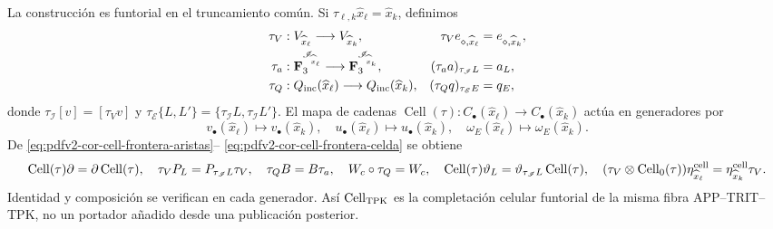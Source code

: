 La construcción es funtorial en el truncamiento común. Si
\(\tau_{\ell,k}\widehat x_\ell=\widehat x_k\), definimos
\begin{align*}
 \tau_V&:V_{\widehat x_\ell}\longrightarrow V_{\widehat x_k},&
 \tau_Ve_{\diamond,\widehat x_\ell}&=e_{\diamond,\widehat x_k},\\
 \tau_a&:\mathbf F_3^{\mathscr I_{\widehat x_\ell}}
          \longrightarrow\mathbf F_3^{\mathscr I_{\widehat x_k}},&
 (\tau_aa)_{\tau_{\mathscr I}L}&=a_L,\\
 \tau_Q&:Q_{\rm inc}(\widehat x_\ell)
          \longrightarrow Q_{\rm inc}(\widehat x_k),&
 (\tau_Qq)_{\tau_{\mathscr E}E}&=q_E,
\end{align*}
donde \(\tau_{\mathscr I}[v]=[\tau_Vv]\) y
\(\tau_{\mathscr E}\{L,L'\}=\{\tau_{\mathscr I}L,
\tau_{\mathscr I}L'\}\). El mapa de cadenas
\(\operatorname{Cell}(\tau):C_\bullet(\widehat x_\ell)
\to C_\bullet(\widehat x_k)\) actúa en generadores por
\begin{equation}
\label{eq:pdfv2-cor-cell-truncamiento-generadores}
 v_\bullet(\widehat x_\ell)\mapsto v_\bullet(\widehat x_k),\quad
 u_\bullet(\widehat x_\ell)\mapsto u_\bullet(\widehat x_k),\quad
 \omega_E(\widehat x_\ell)\mapsto\omega_E(\widehat x_k).
\end{equation}
De \eqref{eq:pdfv2-cor-cell-frontera-aristas}--
\eqref{eq:pdfv2-cor-cell-frontera-celda} se obtiene
\begin{equation}
\label{eq:pdfv2-cor-collar-naturalidad}
 \operatorname{Cell}(\tau)\partial
 =\partial\operatorname{Cell}(\tau),\quad
 \tau_VP_L=P_{\tau_{\mathscr I}L}\tau_V,\quad
 \tau_QB=B\tau_a,\quad
 W_c\circ\tau_Q=W_c,\quad
 \operatorname{Cell}(\tau)\vartheta_L
 =\vartheta_{\tau_{\mathscr I}L}\operatorname{Cell}(\tau),\quad
 (\tau_V\otimes\operatorname{Cell}_0(\tau))
 \eta^{\rm cell}_{\widehat x_\ell}
 =\eta^{\rm cell}_{\widehat x_k}\tau_V.
\end{equation}
Identidad y composición se verifican en cada generador. Así
\(\operatorname{Cell}_{\rm TPK}\) es la completación celular funtorial de
la misma fibra APP--TRIT--TPK, no un portador añadido desde una publicación
posterior.

